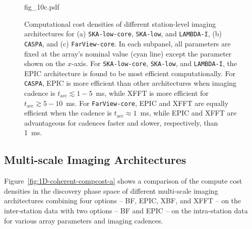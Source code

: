 \documentclass[
  journal=pasa,
  manuscript=article-type,
  year=2020,
  volume=37,
]{cup-journal}
\begin{document}
\begin{figure}
{%
{fig_10c.pdf}
}
\caption{Computational cost densities of different station-level imaging architectures for (a) \texttt{SKA-low-core}, \texttt{SKA-low}, and \texttt{LAMBDA-I}, (b) \texttt{CASPA}, and (c) \texttt{FarView-core}. In each subpanel, all parameters are fixed at the array's nominal value (cyan line) except the parameter shown on the $x$-axis. For \texttt{SKA-low-core}, \texttt{SKA-low}, and \texttt{LAMBDA-I}, the EPIC architecture is found to be most efficient computationally. For \texttt{CASPA}, EPIC is more efficient than other architectures when imaging cadence is $t_\textrm{acc}\lesssim 1-5$~ms, while XFFT is more efficient for $t_\textrm{acc}\gtrsim 5-10$~ms. For \texttt{FarView-core}, EPIC and XFFT are equally efficient when the cadence is $t_\textrm{acc}\approx 1$~ms, while EPIC and XFFT are advantageous for cadences faster and slower, respectively, than 1~ms.  \label{fig:1D-incoherent-compcost}}
\end{figure}

\subsection{Multi-scale Imaging Architectures}\label{sec:multi-scale-imaging}

Figure~\ref{fig:1D-coherent-compcost-a} shows a comparison of the compute cost densities in the discovery phase space of different multi-scale imaging architectures combining four options -- BF, EPIC, XBF, and XFFT -- on the inter-station data with two options -- BF and EPIC -- on the intra-station data for various array parameters and imaging cadences.  
\end{document}
